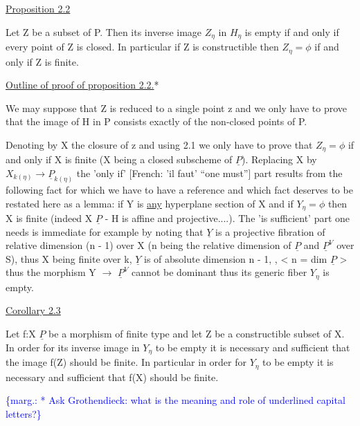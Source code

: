 \documentclass[11pt]{article}
\newcommand{\scanpage}[1]{\par\bigskip\noindent{\small\sffamily[scan #1]}\par}
\newcommand{\mspage}[1]{{\small\sffamily[p.\,#1]}}
\newcommand{\margin}[1]{\textcolor{blue}{\{\textsf{marg.:} #1\}}}
\newcommand{\uline}[1]{\underline{#1}}
\begin{document}
\uline{Proposition 2.2}

Let Z be a subset of P.  Then its inverse image $Z_{\eta}$ in $H_{\eta}$ is
empty if and only if every point of Z is closed.  In particular if
Z is constructible then $Z_{\eta} = \phi$ if and only if Z is finite.

\clearpage
\scanpage{24/10}
\mspage{10}

\uline{Outline of proof of proposition 2.2.}*

We may suppose that Z is reduced to a single point z and we
only have to prove that the image of H in P consists exactly of
the non-closed points of P.

Denoting by X the closure of z and using 2.1 we only have to
prove that $Z_{\eta} = \phi$ if and only if X is finite (X being a closed
subscheme of $\underline{P}$).  Replacing X by $X_{k(\eta)} \to \underline{P}_{k(\eta)}$ the 'only if'
[French:  'il faut' ``one must''] part results from the following
fact for which we have to have a reference and which fact deserves
to be restated here as a lemma:  if Y is \uline{any} hyperplane section of
X and if $Y_{\eta} = \phi$ then X is finite (indeed X \quad\quad $\underline{P}$ - H is affine and
projective....).  The 'is sufficient' part one needs is immediate
for example by noting that $\underline{Y}$ is a projective fibration of relative
dimension (n - 1) over X (n being the relative dimension of $\underline{P}$ and
$\underline{P}^{V}$ over S), thus X being finite over k, $\underline{Y}$ is of absolute dimension
n - 1, , < n = dim $\underline{P}$ > thus the morphism Y $\to$ $\underline{P}^{V}$ cannot be dominant
thus its generic fiber $Y_{\eta}$ is empty.

\uline{Corollary 2.3}

Let f:X \quad\quad\quad\quad $\underline{P}$ be a morphism of finite type and let Z be
a constructible subset of X.  In order for its inverse image in $Y_{\eta}$
to be empty it is necessary and sufficient that the image f(Z)
should be finite.  In particular in order for $Y_{\eta}$ to be empty it is
necessary and sufficient that f(X) should be finite.

\margin{* Ask Grothendieck: what is the meaning and role of underlined
capital letters?}
\end{document}
